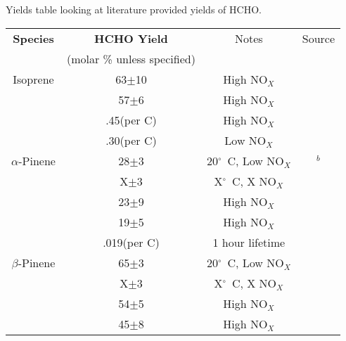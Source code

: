     
    Yields table looking at literature provided yields of HCHO.
    
    \begin{table}
    \begin{tabular}{ | c | c | c | c |  }
      \hline
      \textbf{Species}  & \textbf{HCHO Yield} & Notes & Source
      \\                    & (molar \% unless specified) & &       \\ \hline
      Isoprene          & 63$\pm$10     & High NO$_X$ & \citep{AtkinsonArey2003}      \\
                           & 57$\pm$6       & High NO$_X$ & \citep{AtkinsonArey2003}      \\
                           & .45(per C)       & High NO$_X$ & \citep{Palmer2003}               \\
                           & .30(per C)       & Low  NO$_X$ & \citep{Palmer2003}               \\
      $\alpha$-Pinene & 28$\pm$3      & 20$^\circ$~C, Low NO$_X$ & \citep{Lee2006}$^b$      \\ 
                            & X$\pm$3       & X$^\circ$~C, X NO$_X$ & \citep{Wolfe2016}      \\ 
                            & 23$\pm$9      & High NO$_X$ & \citep{AtkinsonArey2003}      \\ 
                            & 19$\pm$5      & High NO$_X$ & \citep{AtkinsonArey2003}      \\ 
                            & .019(per C)      & 1 hour lifetime & \citep{Palmer2003}               \\
      $\beta$-Pinene & 65$\pm$3       & 20$^\circ$~C, Low NO$_X$ & \citep{Lee2006}      \\ 
                            & X$\pm$3       & X$^\circ$~C, X NO$_X$ & \citep{Wolfe2016}      \\ 
                            & 54$\pm$5      & High NO$_X$ & \citep{AtkinsonArey2003}      \\ 
                            & 45$\pm$8      & High NO$_X$ & \citep{AtkinsonArey2003}      \\ 

\end{tabular}
\end{table}
